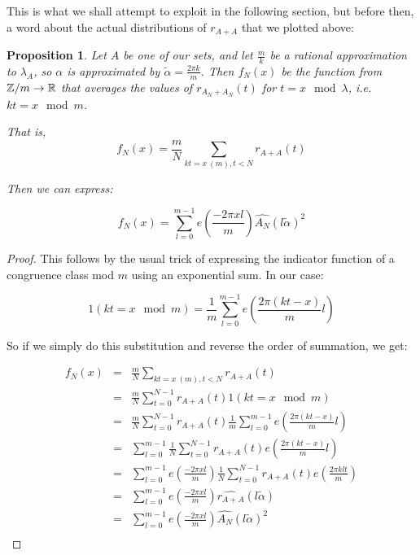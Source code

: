 \documentclass{report}
\newtheorem{proposition}[theorem]{Proposition}
\theoremstyle{remark}
\numberwithin{equation}{section}
\begin{document}
This is what we shall attempt to exploit in the following section, but
before then, a word about the actual distributions of $r_{A+A}$ that
we plotted above: 

\begin{proposition}
  Let $A$ be one of our \relevant sets, and let $\frac{m}{k}$ be a
  rational approximation to $\lambda_A$, so $\alpha$ is approximated
  by $\widetilde{\alpha} = \frac{2\pi k}{m}$.  Then $f_N(x)$ be the
  function from $\mathbb{Z}/m \to \mathbb{R}$ that averages the values of
  $r_{A_N+A_N}(t)$ for $t = x \mod{\lambda}$, i.e. $kt = x \mod{m}$.

  That is, 
  \[f_N(x) = \frac{m}{N} \sum_{kt = x\ \!(m), t < N} r_{A+A}(t)\]

  Then we can express: 

  \[f_N(x) = \sum_{l=0}^{m-1} e(\frac{-2\pi x l}{m}) \widehat{A_N}(l\widetilde{\alpha})^2\]
\end{proposition}

\begin{proof}

This follows by the usual trick of expressing the indicator function
of a congruence class mod $m$ using an exponential sum.  In our case: 


\[1(kt = x\!\!\!\!\mod{m}) = \frac{1}{m}\sum_{l=0}^{m-1} e(\frac{2\pi
    (kt-x)}{m}l)\]

So if we simply do this substitution and reverse the order of
summation, we get: 

\begin{eqnarray*}
  f_N(x) &=& \frac{m}{N} \sum_{kt = x\ \!(m), t < N} r_{A+A}(t)\\
         &=& \frac{m}{N} \sum_{t = 0}^{N-1} r_{A+A}(t)1(kt = x\!\!\!\!\mod{m})\\
         &=& \frac{m}{N} \sum_{t = 0}^{N-1}
             r_{A+A}(t)\frac{1}{m}\sum_{l=0}^{m-1} e(\frac{2\pi (kt-x)}{m}l)\\
         &=& \sum_{l=0}^{m-1} \frac{1}{N} \sum_{t = 0}^{N-1}
             r_{A+A}(t) e(\frac{2\pi (kt-x)}{m}l)\\
         &=& \sum_{l=0}^{m-1} e(\frac{-2\pi x l}{m}) \frac{1}{N} \sum_{t = 0}^{N-1}
             r_{A+A}(t) e(\frac{2\pi klt}{m})\\
         &=& \sum_{l=0}^{m-1} e(\frac{-2\pi x l}{m}) \widehat{r_{A+A}}(l\widetilde{\alpha})\\
         &=& \sum_{l=0}^{m-1} e(\frac{-2\pi x l}{m}) \widehat{A_N}(l\widetilde{\alpha})^2\\
\end{eqnarray*}

\end{proof}
\end{document}
